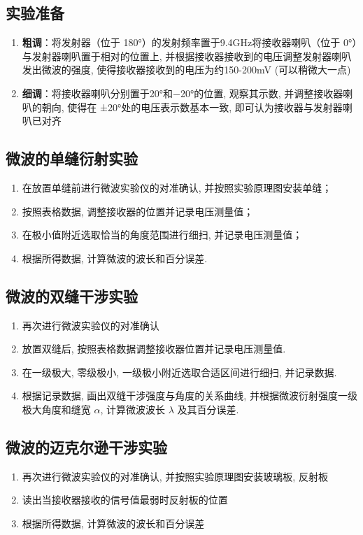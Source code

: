\documentclass[zihao=5, UTF8]{article}
\theoremstyle{MyLineTheoremStyle} %
\theoremstyle{MyBlockTheoremStyle} %
\theoremstyle{MySubsubsectionStyle} %
\begin{document}
\subsection{实验准备}
\begin{enumerate}
    \item \textbf{粗调}：将发射器（位于 180°）的发射频率置于9.4GHz将接收器喇叭（位于 0°）与发射器喇叭置于相对的位置上, 并根据接收器接收到的电压调整发射器喇叭发出微波的强度, 使得接收器接收到的电压为约150-200mV (可以稍微大一点)
    \item \textbf{细调}：将接收器喇叭分别置于20°和−20°的位置, 观察其示数, 并调整接收器喇叭的朝向, 使得在 
±20°处的电压表示数基本一致, 即可认为接收器与发射器喇叭已对齐
\end{enumerate}
\subsection{微波的单缝衍射实验}

\begin{enumerate}
    \item  在放置单缝前进行微波实验仪的对准确认, 并按照实验原理图安装单缝；
    \item  按照表格数据, 调整接收器的位置并记录电压测量值；
    \item  在极小值附近选取恰当的角度范围进行细扫, 并记录电压测量值；
    \item  根据所得数据, 计算微波的波长和百分误差. 
\end{enumerate}
\subsection{微波的双缝干涉实验}
\begin{enumerate}
    \item 再次进行微波实验仪的对准确认
    \item 放置双缝后, 按照表格数据调整接收器位置并记录电压测量值. 
    \item 在一级极大, 零级极小, 一级极小附近选取合适区间进行细扫, 并记录数据. 
    \item 根据记录数据, 画出双缝干涉强度与角度的关系曲线, 并根据微波衍射强度一级极大角度和缝宽 $\alpha$, 计算微波波长 $\lambda$ 及其百分误差. 
\end{enumerate}
\subsection{微波的迈克尔逊干涉实验}
\begin{enumerate}
    \item 再次进行微波实验仪的对准确认, 并按照实验原理图安装玻璃板, 反射板
    \item 读出当接收器接收的信号值最弱时反射板的位置
    \item 根据所得数据, 计算微波的波长和百分误差
\end{enumerate}
\end{document}
